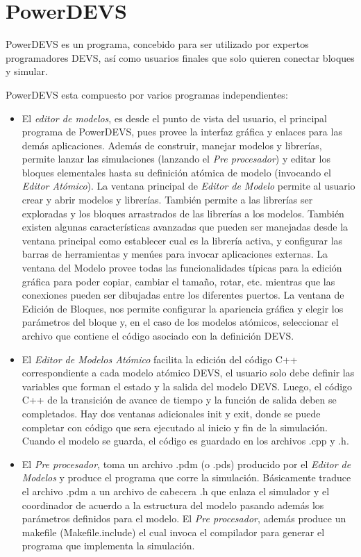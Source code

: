 \documentclass[a4paper,	11pt]{report}
\begin{document}
\section{PowerDEVS}
PowerDEVS es un programa, concebido para ser utilizado por expertos programadores DEVS, así como usuarios finales que solo quieren conectar bloques y simular.

PowerDEVS esta compuesto por varios programas independientes:
\begin{itemize}
\item El \emph{editor de modelos}, es desde el punto de vista del usuario, el principal programa de PowerDEVS, pues provee la interfaz gráfica y enlaces para las demás aplicaciones. 
Además de construir, manejar modelos y librerías, permite lanzar las simulaciones (lanzando el \emph{Pre procesador}) y editar los bloques elementales hasta su definición atómica de modelo (invocando el \emph{Editor Atómico}).
La ventana principal de \emph{Editor de Modelo} permite al usuario crear y abrir modelos y librerías. También permite a las librerías ser exploradas y los bloques arrastrados de las librerías a los modelos.
También existen algunas características avanzadas que pueden ser manejadas desde la ventana principal como establecer cual es la librería activa, y configurar las barras de herramientas y menúes para invocar aplicaciones externas.
La ventana del Modelo provee todas las funcionalidades típicas para la edición gráfica para poder copiar, cambiar el tamaño, rotar, etc. mientras que las conexiones pueden ser dibujadas entre los diferentes puertos.
La ventana de Edición de Bloques, nos permite configurar la apariencia gráfica y elegir los parámetros del bloque y, en el caso de los modelos atómicos, seleccionar el archivo que contiene el código asociado con la definición DEVS.

\item El \emph{Editor de Modelos Atómico} facilita la edición del código C++ correspondiente a cada modelo atómico DEVS, el usuario solo debe definir las variables que forman el estado y la salida del modelo DEVS. Luego, el código C++ de la transición de avance de tiempo y la función de salida deben se completados. Hay dos ventanas adicionales init y exit, donde se puede completar con código que sera ejecutado al inicio y fin de la simulación.
Cuando el modelo se guarda, el código es guardado en los archivos .cpp y .h. 

\item El \emph{Pre procesador}, toma un archivo .pdm (o .pds) producido por el \emph{Editor de Modelos} y produce el programa que corre la simulación. Básicamente traduce el archivo .pdm a un archivo de cabecera .h que enlaza el simulador y el coordinador de acuerdo a la estructura del modelo pasando además los parámetros definidos para el modelo.
El \emph{Pre procesador}, además produce un makefile (Makefile.include) el cual invoca el compilador para generar el programa que implementa la simulación.


\end{itemize}
\end{document}
